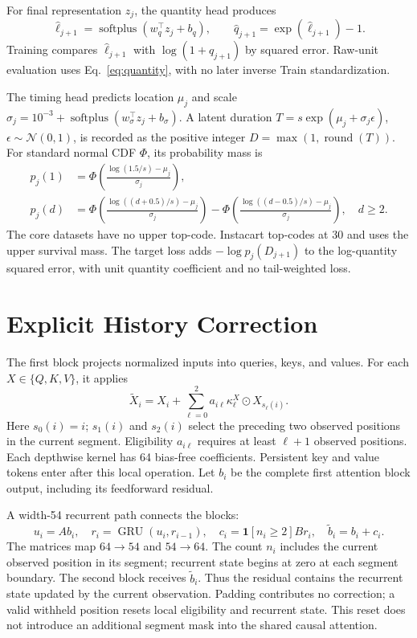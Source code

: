 \documentclass[runningheads]{llncs}
\newcommand{\softplus}{\operatorname{softplus}}
\begin{document}
For final representation $z_j$, the quantity head produces
\begin{equation}
 \widehat\ell_{j+1}=\softplus(w_q^\top z_j+b_q),\qquad
 \widehat q_{j+1}=\exp(\widehat\ell_{j+1})-1 .
 \label{eq:quantity}
\end{equation}
Training compares $\widehat\ell_{j+1}$ with
$\log(1+q_{j+1})$ by squared error. Raw-unit evaluation
uses Eq.~\ref{eq:quantity}, with no later inverse Train
standardization.

The timing head predicts location $\mu_j$ and scale
$\sigma_j=10^{-3}+\softplus(w_\sigma^\top z_j+b_\sigma)$.
A latent duration $T=s\exp(\mu_j+\sigma_j\epsilon)$,
$\epsilon\sim\mathcal N(0,1)$, is recorded as the positive
integer $D=\max(1,\operatorname{round}(T))$.
For standard normal CDF $\Phi$, its probability mass is
\begin{align}
 p_j(1)&=\Phi\left(\frac{\log(1.5/s)-\mu_j}{\sigma_j}\right),
 \label{eq:p1}\\
 p_j(d)&=\Phi\left(\frac{\log((d+0.5)/s)-\mu_j}{\sigma_j}\right)
 -\Phi\left(\frac{\log((d-0.5)/s)-\mu_j}{\sigma_j}\right),
 \quad d\ge2. \label{eq:pd}
\end{align}
The core datasets have no upper top-code. Instacart
top-codes at 30 and uses the upper survival mass.
The target loss adds $-\log p_j(D_{j+1})$ to the log-quantity
squared error, with unit quantity coefficient and no
tail-weighted loss.

\section{Explicit History Correction}
The first block projects normalized inputs into queries,
keys, and values. For each $X\in\{Q,K,V\}$, it applies
\begin{equation}
 \widetilde X_i=X_i+
 \sum_{\ell=0}^{2}a_{i\ell}\kappa^X_\ell
 \odot X_{s_\ell(i)} .
 \label{eq:local}
\end{equation}
Here $s_0(i)=i$; $s_1(i)$ and $s_2(i)$ select the preceding
two observed positions in the current segment.
Eligibility $a_{i\ell}$ requires at least $\ell+1$
observed positions. Each depthwise kernel has 64
bias-free coefficients. Persistent key and value tokens
enter after this local operation. Let $b_i$ be the
complete first attention block output, including its
feedforward residual.

A width-54 recurrent path connects the blocks:
\begin{equation}
 u_i=A b_i,\quad r_i=\operatorname{GRU}(u_i,r_{i-1}),
 \quad c_i=\mathbf1[n_i\ge2]B r_i,\quad
 \widetilde b_i=b_i+c_i .
 \label{eq:gru}
\end{equation}
The matrices map $64\!\to\!54$ and $54\!\to\!64$.
The count $n_i$ includes the current observed position
in its segment; recurrent state begins at zero at
each segment boundary. The second block receives
$\widetilde b_i$. Thus the residual contains the
recurrent state updated by the current observation.
Padding contributes no correction; a valid withheld
position resets local eligibility and recurrent state.
This reset does not introduce an additional segment
mask into the shared causal attention.
\end{document}
